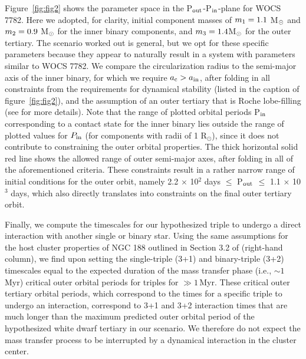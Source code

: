 \documentclass[twocolumn]{aastex62}
\def\simon#1{{\bf {\color{red}[#1 -- Simon]}}}
\begin{document}
Figure~\ref{fig:fig2} shows the parameter space in the P$_{\rm
  out}$-P$_{\rm in}$-plane for WOCS 7782.  Here we adopted, for
clarity, initial component masses of $m_{\rm 1} = 1.1$ M$_{\rm \odot}$
and $m_{\rm 2} = 0.9$ M$_{\rm \odot}$ for the inner binary components,
and $m_{\rm 3} = 1.4 $M$_{\rm \odot}$ for the outer tertiary.  The
scenario worked out is general, but we opt for these specific
parameters because they appear to naturally result in a system with
parameters similar to WOCS 7782.  We compare the circularization
radius to the semi-major axis of the inner binary, for which we
require $a_{\rm c} > a_{\rm in}$, after folding in all constraints
from the requirements for dynamical stability (listed in the caption
of figure~\ref{fig:fig2}), and the assumption of an outer tertiary
that is Roche lobe-filling (see \citet{2014MNRAS.438.1909D} for more
details).
Note that the range of plotted orbital periods P$_{\rm in}$
corresponding to a contact state for the inner binary lies outside the
range of plotted values for $P_{\rm in}$ (for components with radii of
1 R$_{\odot}$), since it does not contribute to constraining the outer
orbital properties.  The thick horizontal solid red line shows the
allowed range of outer semi-major axes, after folding in all of the
aforementioned criteria.  These constraints result in a rather narrow
range of initial conditions for the outer orbit, namely 2.2 $\times$
10$^{2}$ days $\le$ P$_{\rm out}$ $\le$ 1.1 $\times$ 10$^3$ days,
which also directly translates into constraints on the final
  outer tertiary orbit.

Finally, we compute the timescales for our hypothesized triple to
undergo a direct interaction with another single or binary star.
Using the same assumptions for the host cluster properties of NGC 188
outlined in Section 3.2 of \citet{2011MNRAS.410.2370L} (right-hand
column), we find upon setting the single-triple (3+1) and
binary-triple (3+2) timescales equal to the expected duration of the
mass transfer phase (i.e., $\sim 1$\, Myr) critical outer orbital
periods for triples for $\gg 1$\,Myr.  These critical outer tertiary
orbital periods, which correspond to the times for a specific triple
to undergo an interaction, correspond to 3+1 and 3+2 interaction times
that are much longer than the maximum predicted outer orbital period
of the hypothesized white dwarf tertiary in our scenario.  We
therefore do not expect the mass transfer process to be interrupted by
a dynamical interaction in the cluster center.
\end{document}
